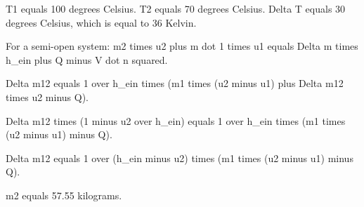T1 equals 100 degrees Celsius.
T2 equals 70 degrees Celsius.
Delta T equals 30 degrees Celsius, which is equal to 36 Kelvin.

For a semi-open system:
m2 times u2 plus m dot 1 times u1 equals Delta m times h_ein plus Q minus V dot n squared.

Delta m12 equals 1 over h_ein times (m1 times (u2 minus u1) plus Delta m12 times u2 minus Q).

Delta m12 times (1 minus u2 over h_ein) equals 1 over h_ein times (m1 times (u2 minus u1) minus Q).

Delta m12 equals 1 over (h_ein minus u2) times (m1 times (u2 minus u1) minus Q).

m2 equals 57.55 kilograms.